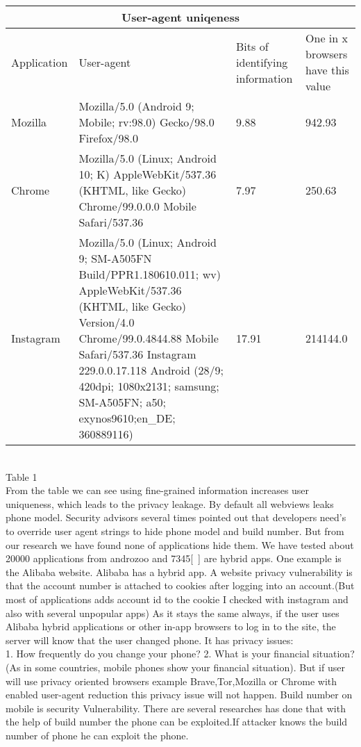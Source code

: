 \begin{tabular}{ |p{3cm}||p{3cm}|p{3cm}|p{3cm} |}
 \hline
 \multicolumn{4}{|c|}{User-agent uniqeness} \\
 \hline
Application & User-agent& Bits of identifying information& One in x browsers have this value\\
 \hline
Mozilla & Mozilla/5.0 (Android 9; Mobile; rv:98.0) Gecko/98.0 Firefox/98.0& 9.88 & 942.93\\
 \hline
Chrome & Mozilla/5.0 (Linux; Android 10; K) AppleWebKit/537.36 (KHTML, like Gecko) Chrome/99.0.0.0 Mobile Safari/537.36 & 7.97 & 250.63\\
 \hline
Instagram & Mozilla/5.0 (Linux; Android 9; SM-A505FN Build/PPR1.180610.011; wv) AppleWebKit/537.36 (KHTML, like Gecko) Version/4.0  Chrome/99.0.4844.88 Mobile Safari/537.36 Instagram 229.0.0.17.118  Android (28/9; 420dpi; 1080x2131;           samsung; SM-A505FN; a50; exynos9610;en\_DE; 360889116) &17.91 & 214144.0\\
\hline
\end{tabular}\\
  Table 1 
 \\
From the table we can see using fine-grained information increases user uniqueness, which leads to the privacy leakage.
By default all webviews leaks phone model. Security advisors several times pointed out that developers need's to override user agent strings to hide phone model and build number\cite{forum}\cite{nightwatch}\cite{nightwatch1}. But from our research we have found none of applications hide them. We have tested about 20000 applications from androzoo and 7345[~] are hybrid apps. 
One example is the Alibaba website. Alibaba has a hybrid app. A website privacy vulnerability is that the account number is attached to cookies after logging into an account.(But most of applications adds account id to the cookie I checked with instagram and also with several unpopular apps) As it stays the same always, if the user uses Alibaba hybrid applications or other in-app browsers to log in to the site, the server will know that the user changed phone. It has privacy issues:\\
1. How frequently do you change your phone?
2. What is your financial situation? (As in some countries, mobile phones show your financial situation).
But if user will use privacy oriented browsers example Brave,Tor,Mozilla or Chrome with enabled user-agent reduction this privacy issue will not happen. 
Build number on mobile is security Vulnerability. There are several researches has done that with the help of build number the phone can be exploited\cite{nightwatch02}.If attacker knows the build number of phone he can exploit the phone. 

